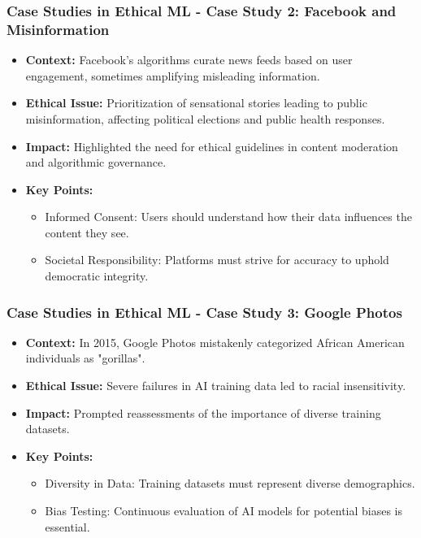 \documentclass[aspectratio=169]{beamer}
\begin{document}
\begin{frame}[fragile]
    \frametitle{Case Studies in Ethical ML - Case Study 2: Facebook and Misinformation}
    \begin{itemize}
        \item \textbf{Context:} Facebook's algorithms curate news feeds based on user 
        engagement, sometimes amplifying misleading information.
        \item \textbf{Ethical Issue:} Prioritization of sensational stories leading 
        to public misinformation, affecting political elections and public health responses.
        \item \textbf{Impact:} Highlighted the need for ethical guidelines in content 
        moderation and algorithmic governance.
        \item \textbf{Key Points:}
        \begin{itemize}
            \item Informed Consent: Users should understand how their data influences 
            the content they see.
            \item Societal Responsibility: Platforms must strive for accuracy to uphold 
            democratic integrity.
        \end{itemize}
    \end{itemize}
\end{frame}

\begin{frame}[fragile]
    \frametitle{Case Studies in Ethical ML - Case Study 3: Google Photos}
    \begin{itemize}
        \item \textbf{Context:} In 2015, Google Photos mistakenly categorized African 
        American individuals as "gorillas".
        \item \textbf{Ethical Issue:} Severe failures in AI training data led to 
        racial insensitivity.
        \item \textbf{Impact:} Prompted reassessments of the importance of diverse 
        training datasets.
        \item \textbf{Key Points:}
        \begin{itemize}
            \item Diversity in Data: Training datasets must represent diverse demographics.
            \item Bias Testing: Continuous evaluation of AI models for potential biases is essential.
        \end{itemize}
    \end{itemize}
\end{frame}
\end{document}
